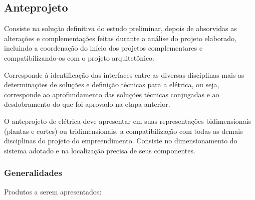 \subsection{Anteprojeto} \label{subsection: anteprojeto}

Consiste na solução definitiva do estudo preliminar, depois de absorvidas as alterações e complementações feitas durante a análise do projeto elaborado, incluindo a coordenação do início dos projetos complementares e compatibilizando-os com o projeto arquitetônico.

Corresponde à identificação das interfaces entre as diversas disciplinas mais as determinações de soluções e definição técnicas para a elétrica, ou seja, corresponde ao aprofundamento das soluções técnicas conjugadas e ao desdobramento do que foi aprovado na etapa anterior.

O anteprojeto de elétrica deve apresentar em suas representações bidimensionais (plantas e cortes) ou tridimensionais, a compatibilização com todas as demais disciplinas do projeto do empreendimento.
Consiste no dimensionamento do sistema adotado e na localização precisa de seus componentes.

\subsubsection{Generalidades}
Produtos a serem apresentados:
